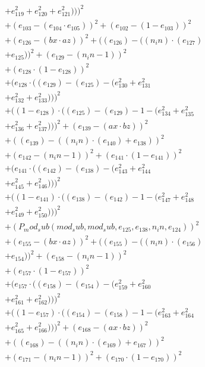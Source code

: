 \documentclass[10pt, a4paper]{article}
\begin{document}
\begin{align*}
& + e_{119}^{2} + e_{120}^{2} + e_{121}^{2})))^{2} \\
& + (e_{103} - (e_{104}  \cdot  e_{105}))^{2} + (e_{102} - (1 - e_{103}))^{2} \\
& + (e_{126} - (bx  \cdot  az))^{2} + ((e_{126}) - ((n_in)  \cdot  (e_{127}) \\
& + e_{125}))^{2} + (e_{129} - (n_in - 1))^{2} \\
& + (e_{128}  \cdot  (1 - e_{128}))^{2} \\
& + (e_{128}  \cdot  ((e_{129}) - (e_{125}) - (e_{130}^{2} + e_{131}^{2} \\
& + e_{132}^{2} + e_{133}^{2})))^{2} \\
& + ((1 - e_{128})  \cdot  ((e_{125}) - (e_{129}) - 1 - (e_{134}^{2} + e_{135}^{2} \\
& + e_{136}^{2} + e_{137}^{2})))^{2} + (e_{139} - (ax  \cdot  bz))^{2} \\
& + ((e_{139}) - ((n_in)  \cdot  (e_{140}) + e_{138}))^{2} \\
& + (e_{142} - (n_in - 1))^{2} + (e_{141}  \cdot  (1 - e_{141}))^{2} \\
& + (e_{141}  \cdot  ((e_{142}) - (e_{138}) - (e_{143}^{2} + e_{144}^{2} \\
& + e_{145}^{2} + e_{146}^{2})))^{2} \\
& + ((1 - e_{141})  \cdot  ((e_{138}) - (e_{142}) - 1 - (e_{147}^{2} + e_{148}^{2} \\
& + e_{149}^{2} + e_{150}^{2})))^{2} \\
& + (P_mod_sub(mod_sub, mod_sub, e_{125}, e_{138}, n_in, e_{124}))^{2} \\
& + (e_{155} - (bx  \cdot  az))^{2} + ((e_{155}) - ((n_in)  \cdot  (e_{156}) \\
& + e_{154}))^{2} + (e_{158} - (n_in - 1))^{2} \\
& + (e_{157}  \cdot  (1 - e_{157}))^{2} \\
& + (e_{157}  \cdot  ((e_{158}) - (e_{154}) - (e_{159}^{2} + e_{160}^{2} \\
& + e_{161}^{2} + e_{162}^{2})))^{2} \\
& + ((1 - e_{157})  \cdot  ((e_{154}) - (e_{158}) - 1 - (e_{163}^{2} + e_{164}^{2} \\
& + e_{165}^{2} + e_{166}^{2})))^{2} + (e_{168} - (ax  \cdot  bz))^{2} \\
& + ((e_{168}) - ((n_in)  \cdot  (e_{169}) + e_{167}))^{2} \\
& + (e_{171} - (n_in - 1))^{2} + (e_{170}  \cdot  (1 - e_{170}))^{2} \\

\end{align*}
\end{document}
